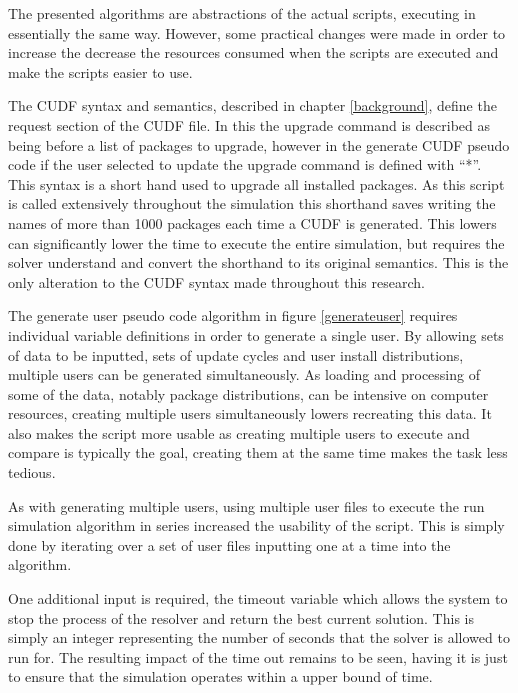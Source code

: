 The presented algorithms are abstractions of the actual scripts, executing in essentially the same way. 
However, some practical changes were made in order to increase the decrease the resources consumed when the scripts are executed and make the scripts easier to use.

The CUDF syntax and semantics, described in chapter \ref{background}, define the request section of the CUDF file.
In this the upgrade command is described as being before a list of packages to upgrade,
however in the generate CUDF pseudo code if the user selected to update the upgrade command is defined with ``*''.
This syntax is a short hand used to upgrade all installed packages.
As this script is called extensively throughout the simulation this shorthand saves writing the names of more than 1000 packages each time a CUDF is generated.
This lowers can significantly lower the time to execute the entire simulation, but requires the solver understand and convert the shorthand to its original semantics.
This is the only alteration to the CUDF syntax made throughout this research.

The generate user pseudo code algorithm in figure \ref{generateuser} requires individual variable definitions in order to generate a single user.
By allowing sets of data to be inputted, sets of update cycles and user install distributions, multiple users can be generated simultaneously.
As loading and processing of some of the data, notably package distributions, can be intensive on computer resources, 
creating multiple users simultaneously lowers recreating this data.
It also makes the script more usable as creating multiple users to execute and compare is typically the goal,
creating them at the same time makes the task less tedious.

As with generating multiple users, using multiple user files to execute the run simulation algorithm in series increased the usability of the script.
This is simply done by iterating over a set of user files inputting one at a time into the algorithm. 

One additional input is required, the timeout variable which allows the system to stop the process of the resolver and return the best current solution.
This is simply an integer representing the number of seconds that the solver is allowed to run for.
The resulting impact of the time out remains to be seen, having it is just to ensure that the simulation operates within a upper bound of time.

